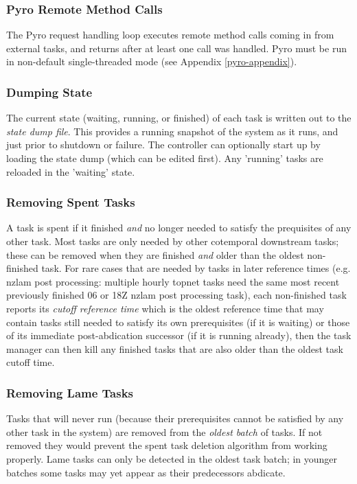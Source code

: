 \documentclass[11pt,a4paper]{article}
\begin{document}
\subsubsection{Pyro Remote Method Calls}

The Pyro request handling loop executes remote method calls coming in
from external tasks, and returns after at least one call was handled.
Pyro must be run in non-default single-threaded mode (see Appendix
\ref{pyro-appendix}).

\subsubsection{Dumping State} 

The current state (waiting, running, or finished) of each task is
written out to the {\em state dump file}.  This provides a running
snapshot of the system as it runs, and just prior to shutdown or
failure. The controller can optionally start up by loading the state
dump (which can be edited first). Any 'running' tasks are reloaded in
the 'waiting' state.

\subsubsection{Removing Spent Tasks} 

A task is spent if it finished {\em and} no longer needed to satisfy the
prequisites of any other task. Most tasks are only needed by other
cotemporal downstream tasks; these can be removed when they are finished
{\em and} older than the oldest non-finished task. For rare cases that
are needed by tasks in later reference times (e.g. nzlam post
processing: multiple hourly topnet tasks need the same most recent
previously finished 06 or 18Z nzlam post processing task), each
non-finished task reports its {\em cutoff reference time} which is the
oldest reference time that may contain tasks still needed to satisfy its
own prerequisites (if it is waiting) or those of its immediate
post-abdication successor (if it is running already), then the task
manager can then kill any finished tasks that are also older than the
oldest task cutoff time.

\subsubsection{Removing Lame Tasks} 

Tasks that will never run (because their prerequisites cannot be
satisfied by any other task in the system) are removed from the {\em
oldest batch} of tasks.  If not removed they would prevent the spent
task deletion algorithm from working properly. Lame tasks can only be
detected in the oldest task batch; in younger batches some tasks may yet
appear as their predecessors abdicate.
\end{document}
